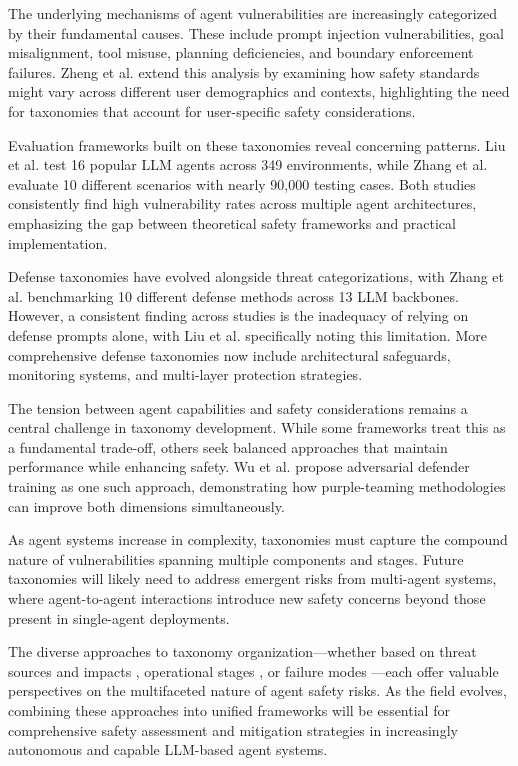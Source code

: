\documentclass[conference]{IEEEtran}
\begin{document}
The underlying mechanisms of agent vulnerabilities are increasingly categorized by their fundamental causes. These include prompt injection vulnerabilities, goal misalignment, tool misuse, planning deficiencies, and boundary enforcement failures. Zheng et al. \cite{2502.15086} extend this analysis by examining how safety standards might vary across different user demographics and contexts, highlighting the need for taxonomies that account for user-specific safety considerations.

Evaluation frameworks built on these taxonomies reveal concerning patterns. Liu et al. \cite{2412.14470} test 16 popular LLM agents across 349 environments, while Zhang et al. \cite{2410.02644} evaluate 10 different scenarios with nearly 90,000 testing cases. Both studies consistently find high vulnerability rates across multiple agent architectures, emphasizing the gap between theoretical safety frameworks and practical implementation.

Defense taxonomies have evolved alongside threat categorizations, with Zhang et al. \cite{2410.02644} benchmarking 10 different defense methods across 13 LLM backbones. However, a consistent finding across studies is the inadequacy of relying on defense prompts alone, with Liu et al. \cite{2412.14470} specifically noting this limitation. More comprehensive defense taxonomies now include architectural safeguards, monitoring systems, and multi-layer protection strategies.

The tension between agent capabilities and safety considerations remains a central challenge in taxonomy development. While some frameworks treat this as a fundamental trade-off, others seek balanced approaches that maintain performance while enhancing safety. Wu et al. \cite{2407.01850} propose adversarial defender training as one such approach, demonstrating how purple-teaming methodologies can improve both dimensions simultaneously.

As agent systems increase in complexity, taxonomies must capture the compound nature of vulnerabilities spanning multiple components and stages. Future taxonomies will likely need to address emergent risks from multi-agent systems, where agent-to-agent interactions introduce new safety concerns beyond those present in single-agent deployments.

The diverse approaches to taxonomy organization—whether based on threat sources and impacts \cite{2411.09523}, operational stages \cite{2410.02644}, or failure modes \cite{2412.14470}—each offer valuable perspectives on the multifaceted nature of agent safety risks. As the field evolves, combining these approaches into unified frameworks will be essential for comprehensive safety assessment and mitigation strategies in increasingly autonomous and capable LLM-based agent systems.
\end{document}
